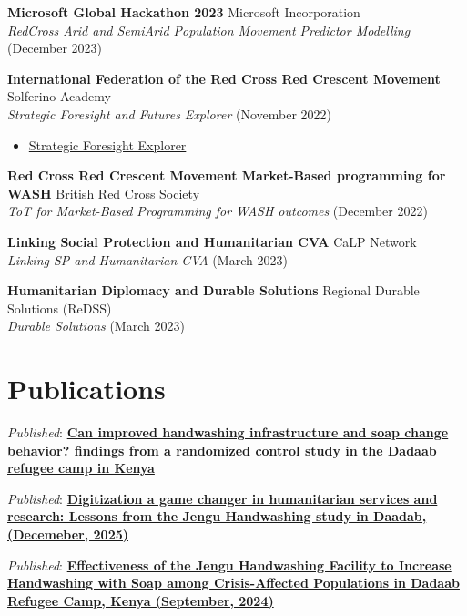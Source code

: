 \documentclass[line,margin,10pt]{res}
\begin{document}
\begin{resume}
\textbf{Microsoft Global Hackathon 2023} \hfill Microsoft Incorporation\\
{\sl RedCross Arid and SemiArid Population Movement Predictor Modelling} \hfill (December 2023)

\textbf{International Federation of the Red Cross Red Crescent Movement} \hfill Solferino Academy\\
{\sl Strategic Foresight and Futures Explorer} \hfill (November 2022)
\begin{itemize} \itemsep -2pt
    \item \href{https://www.virtualbadge.io/certificate-validator?credential=cer-433e718d-cb4c-4c07-9436-1bbb67b6}{Strategic Foresight Explorer}
\end{itemize}

\textbf{Red Cross Red Crescent Movement Market-Based programming for WASH} \hfill British Red Cross Society\\
{\sl ToT for Market-Based Programming for WASH outcomes} \hfill (December 2022)

\textbf{Linking Social Protection and Humanitarian CVA } \hfill CaLP Network\\
{\sl Linking SP and Humanitarian CVA} \hfill (March 2023)

\textbf{Humanitarian Diplomacy and Durable Solutions} \hfill Regional Durable Solutions (ReDSS)\\
{\sl Durable Solutions} \hfill (March 2023)

{\vspace{-0.25cm}}

\section{Publications}

{\sl Published}: \textbf{\href{https://doi.org/10.1186/s13031-026-00793-2}{Can improved handwashing infrastructure and soap change behavior? findings from a randomized control study in the Dadaab refugee camp in Kenya}}

{\sl Published}: \textbf{\href{https://aphrc.org/wp-content/uploads/2026/01/3-Jengu-learning-brief.pdf}{Digitization a game changer in humanitarian services and research: Lessons from the Jengu Handwashing study in Daadab, (Decemeber, 2025)}}

{\sl Published}: \textbf{\href{https://aphrc.org/wp-content/uploads/2024/09/Jengu-Handwashing-Brief_final.pdf}{Effectiveness of the Jengu Handwashing Facility to Increase Handwashing with Soap among Crisis-Affected Populations in Dadaab Refugee Camp, Kenya (September, 2024)}}


\end{resume}
\end{document}
